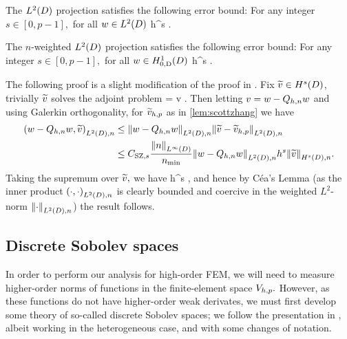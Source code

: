The $\LtD$ projection satisfies the following error bound:
\label{lem:ltdprojerr}
For any integer $s \in [0,p-1],$ for all $w \in \LtD$
\beqs
{} \leq \Cmsz h^{s} .
\eeqs
\ele

The $n$-weighted $\LtD$ projection satisfies the following error bound:
\label{lem:wltdprojerr}
For any integer $s \in [0,p-1],$ for all $w \in \HozDD$
\beq\label{eq:wltdprojerr}
 \leq {}  h^{s} .
\eeq
\ele

The following proof is a slight modification of the proof in \cite[Theorem 5.8.3]{BrSc:08}. Fix $\vtilde \in \HsD$, trivially $\widetilde{v}$ solves the adjoint problem
\beqs
{} =  \tforall v \in \LtD.
\eeqs
Then letting $v=w-Q_{h,n} w$ and using Galerkin orthogonality, for $\widetilde{v}_{h,p}$ as in \cref{lem:scottzhang} we have
\begin{align*}
\IPLtDn{w-\Qhn w}{\vtilde} &\leq \NLtDn{w-\Qhn w}\NLtDn{\vtilde-\vhptilde}\\
&\leq \CSZfn{s} \frac{\NLiD{n}}{\nmin}\NLtDn{w-\Qhn w} h^s \NHsDn{\vtilde}.
\end{align*}
Taking the supremum over $\widetilde{v},$ we have
\beqs
{} \leq {}  h^s ,
\eeqs
and hence by C\'ea's Lemma (as the inner product $\IPLtDn{\cdot}{\cdot}$ is clearly bounded and coercive in the weighted $L^2$-norm $\NLtDn{\cdot}$) the result follows.
\epf

\subsection{Discrete Sobolev spaces}\label{sec:discsob}
In order to perform our analysis for high-order FEM, we will need to measure higher-order norms of functions in the finite-element space $V_{h,p}.$ However, as these functions do not have higher-order weak derivates, we must first develop some theory of so-called discrete Sobolev spaces; we follow the presentation in \cite{DuWu:15}, albeit working in the heterogeneous case, and with some changes of notation.

